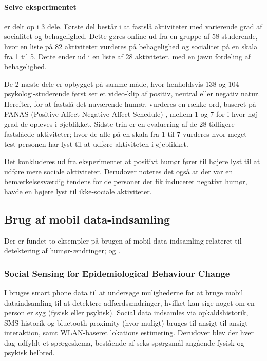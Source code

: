 \paragraph{Selve eksperimentet} er delt op i 3 dele.
Første del består i at fastslå aktiviteter med varierende grad af socialitet og behagelighed.
Dette gøres online ud fra en gruppe af 58 studerende, hvor en liste på 82 aktiviteter vurderes på behagelighed og socialitet på en skala fra 1 til 5.
Dette ender ud i en liste af 28 aktiviteter, med en jævn fordeling af behagelighed.

De 2 næste dele er opbygget på samme måde, hvor henholdsvis 138 og 104 psykologi-studerende først ser et video-klip af positiv, neutral eller negativ natur.
Herefter, for at fastslå det nuværende humør, vurderes en række ord, baseret på PANAS (Positive Affect Negative Affect Schedule) \cite{panas}, mellem 1 og 7 for i hvor høj grad de opleves i øjeblikket.
Sidste trin er en evaluering af de 28 tidligere fastslåede aktiviteter; hvor de alle på en skala fra 1 til 7 vurderes hvor meget test-personen har lyst til at udføre aktiviteten i øjeblikket.

Det konkluderes ud fra eksperimentet at positivt humør fører til højere lyst til at udføre mere sociale aktiviteter.
Derudover noteres det også at der var en bemærkelsesværdig tendens for de personer der fik induceret negativt humør, havde en højere lyst til ikke-sociale aktiviteter.

\subsection{Brug af mobil data-indsamling}
Der er fundet to eksempler på brugen af mobil data-indsamling relateret til detektering af humør-ændringer; \citet{social_sensing} og \citet{social_sensing_2}.

\subsubsection{Social Sensing for Epidemiological Behaviour Change}
I \citet{social_sensing} bruges smart phone data til at undersøge mulighederne for at bruge mobil dataindsamling til at detektere adfærdsændringer, hvilket kan sige noget om en person er syg (fysisk eller psykisk).
Social data indsamles via opkaldshistorik, SMS-historik og bluetooth proximity (hvor muligt) bruges til ansigt-til-ansigt interaktion, samt WLAN-baseret lokations estimering.
Derudover blev der hver dag udfyldt et spørgeskema, bestående af seks spørgsmål angående fysisk og psykisk helbred.

